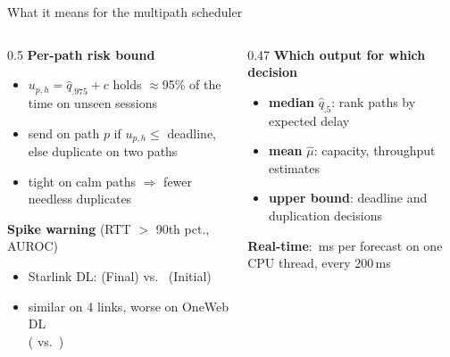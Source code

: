 \documentclass[aspectratio=169,11pt]{beamer}
\newcommand{\good}[1]{\textcolor{Good}{\textbf{#1}}}
\begin{document}
\begin{frame}{What it means for the multipath scheduler}
  \begin{columns}[T,onlytextwidth]
  \begin{column}{0.5\textwidth}
  \textbf{Per-path risk bound}
  \begin{itemize}\small
    \item $u_{p,h}=\hat q_{.975}+c$ holds $\approx$95\% of the time on unseen sessions
    \item send on path $p$ if $u_{p,h}\le$ deadline, else duplicate on two paths
    \item tight on calm paths $\Rightarrow$ fewer needless duplicates
  \end{itemize}
  \textbf{Spike warning} (RTT $>$ 90th pct., AUROC)
  \begin{itemize}\small
    \item Starlink DL: \good{\AUCYthreeSLDL} (Final) vs.\ \AUCYtwoSLDL{} (Initial)
    \item similar on 4 links, worse on OneWeb DL\\(\AUCYthreeOWDL{} vs.\ \AUCYtwoOWDL)
  \end{itemize}
  \end{column}
  \begin{column}{0.47\textwidth}
  \textbf{Which output for which decision}
  \begin{itemize}\small
    \item \textbf{median} $\hat q_{.5}$: rank paths by expected delay
    \item \textbf{mean} $\hat\mu$: capacity, throughput estimates
    \item \textbf{upper bound}: deadline and duplication decisions
  \end{itemize}
  \vspace{0.2cm}
  \textbf{Real-time}: \TimeDSCPU\,ms per forecast on one CPU thread, every 200\,ms
  \end{column}
  \end{columns}
\end{frame}
\end{document}
